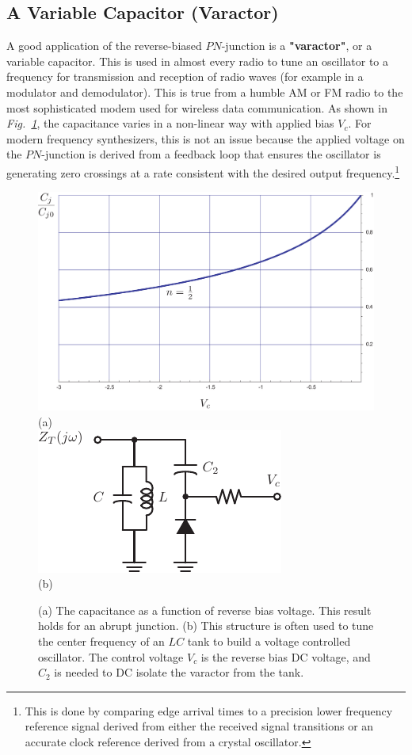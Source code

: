 \subsection{A Variable Capacitor (Varactor)}
A good application of the reverse-biased $PN$-junction is a \textbf{"varactor"}, or a variable capacitor.  This is used in almost every radio to tune an oscillator to a frequency for transmission and reception of radio waves (for example in a modulator and demodulator).  This is true from a humble AM or FM radio to the most sophisticated modem used for wireless data communication.  As shown in \emph{Fig.~\ref{fig:slide33}}, the capacitance varies in a non-linear way with applied bias $V_c$.  For modern frequency synthesizers, this is not an issue because the applied voltage on the $PN$-junction is derived from a feedback loop that ensures the oscillator is generating zero crossings at a rate consistent with the desired output frequency.\footnote{This is done by comparing edge arrival times to a precision lower frequency reference signal derived from either the received signal  transitions or an accurate clock reference derived from a crystal oscillator.}
\begin{figure}[H]
\centering
\includegraphics[width=.85\columnwidth]{slide33}\\
(a)\\
\includegraphics[width=.55\columnwidth]{lctank_varac}\\
(b)\\
\caption{(a) The capacitance as a function of reverse bias voltage.  This result holds for an abrupt junction. (b)  This structure is often used to tune the center frequency of an $LC$ tank to build a voltage controlled oscillator.  The control voltage $V_c$ is the reverse bias DC voltage, and $C_2$ is needed to DC isolate the varactor from the tank.}
\label{fig:slide33}
\end{figure}
